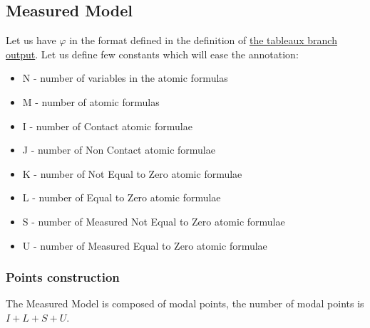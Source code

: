 \documentclass{article}
\begin{document}
	\subsection{Measured Model}
		Let us have $\varphi$ in the format defined in the definition of \hyperref[tableaux:branch:output]{the tableaux branch output}. %
		Let us define few constants which will ease the annotation:
		\begin{itemize}
			\item N - number of variables in the atomic formulas
			\item M - number of atomic formulas
			\item I - number of Contact atomic formulae
			\item J - number of Non Contact atomic formulae
			\item K - number of Not Equal to Zero atomic formulae
			\item L - number of Equal to Zero atomic formulae
			\item S - number of Measured Not Equal to Zero atomic formulae
			\item U - number of Measured Equal to Zero atomic formulae
		\end{itemize}
		
		\subsubsection*{Points construction}
		The Measured Model is composed of modal points, the number of modal points is $I + L + S + U$.
		
\end{document}
